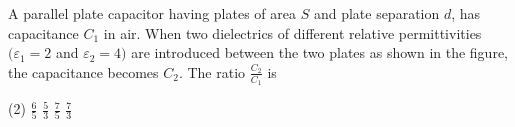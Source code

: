 
\item A parallel plate capacitor having plates of area \( S \) and plate separation \( d \), has capacitance \( C_1 \) in air. When two dielectrics of different relative permittivities \( (\varepsilon_1 = 2 \) and \( \varepsilon_2 = 4) \) are introduced between the two plates as shown in the figure, the capacitance becomes \( C_2 \). The ratio \( \frac{C_2}{C_1} \) is
        \begin{tasks}(2)
            \task \( \frac{6}{5} \)
            \task \( \frac{5}{3} \)
            \task \( \frac{7}{5} \)
            \task \( \frac{7}{3} \)
        \end{tasks}
        \begin{center}
        \end{center}

